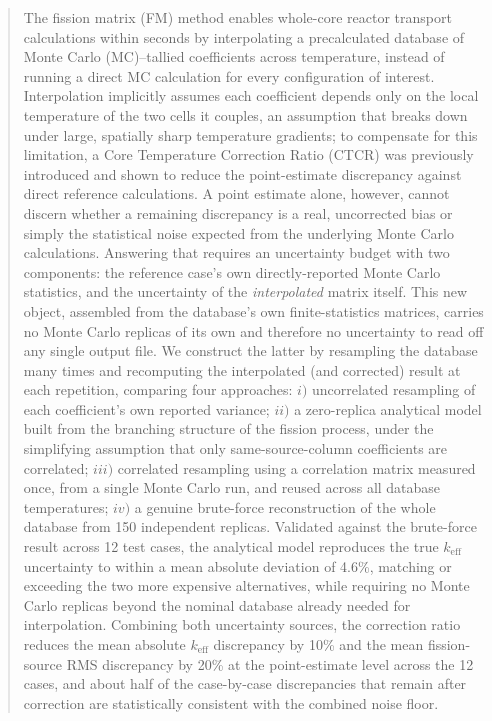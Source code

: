 \documentclass{style/nseJournal}
\begin{document}
\begin{abstract}
The fission matrix (FM) method enables whole-core reactor transport calculations within seconds by interpolating a precalculated database of Monte Carlo (MC)--tallied coefficients across temperature, instead of running a direct MC calculation for every configuration of interest. Interpolation implicitly assumes each coefficient depends only on the local temperature of the two cells it couples, an assumption that breaks down under large, spatially sharp temperature gradients; to compensate for this limitation, a Core Temperature Correction Ratio (CTCR) was previously introduced and shown to reduce the point-estimate discrepancy against direct reference calculations. A point estimate alone, however, cannot discern whether a remaining discrepancy is a real, uncorrected bias or simply the statistical noise expected from the underlying Monte Carlo calculations. Answering that requires an uncertainty budget with two components: the reference case's own directly-reported Monte Carlo statistics, and the uncertainty of the \emph{interpolated} matrix itself. This new object, assembled from the database's own finite-statistics matrices, carries no Monte Carlo replicas of its own and therefore no uncertainty to read off any single output file. We construct the latter by resampling the database many times and recomputing the interpolated (and corrected) result at each repetition, comparing four approaches: $i)$ uncorrelated resampling of each coefficient's own reported variance; $ii)$ a zero-replica analytical model built from the branching structure of the fission process, under the simplifying assumption that only same-source-column coefficients are correlated; $iii)$ correlated resampling using a correlation matrix measured once, from a single Monte Carlo run, and reused across all database temperatures; $iv)$ a genuine brute-force reconstruction of the whole database from 150 independent replicas. Validated against the brute-force result across 12 test cases, the analytical model reproduces the true $k_{\text{eff}}$ uncertainty to within a mean absolute deviation of 4.6\%, matching or exceeding the two more expensive alternatives, while requiring no Monte Carlo replicas beyond the nominal database already needed for interpolation. Combining both uncertainty sources, the correction ratio reduces the mean absolute $k_{\text{eff}}$ discrepancy by 10\% and the mean fission-source RMS discrepancy by 20\% at the point-estimate level across the 12 cases, and about half of the case-by-case discrepancies that remain after correction are statistically consistent with the combined noise floor.
\end{abstract}
\end{document}
